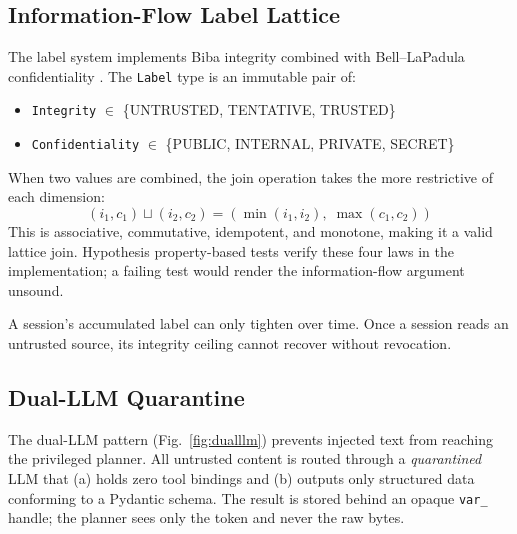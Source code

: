 \documentclass[10pt,conference]{IEEEtran}
\begin{document}
\subsection{Information-Flow Label Lattice}

The label system implements Biba integrity \cite{biba1977integrity} combined
with Bell--LaPadula confidentiality \cite{bell1973secure}. The \texttt{Label}
type is an immutable pair of:
\begin{itemize}
  \item \texttt{Integrity} $\in$ \{UNTRUSTED, TENTATIVE, TRUSTED\}
  \item \texttt{Confidentiality} $\in$ \{PUBLIC, INTERNAL, PRIVATE, SECRET\}
\end{itemize}

When two values are combined, the join operation takes the more restrictive
of each dimension:
\begin{equation}
(i_1, c_1) \sqcup (i_2, c_2) = (\min(i_1, i_2), \;\max(c_1, c_2))
\end{equation}
This is associative, commutative, idempotent, and monotone, making it a valid
lattice join. Hypothesis property-based tests verify these four laws in the implementation;
a failing test would render the information-flow argument unsound.

A session's accumulated label can only tighten over time. Once a session
reads an untrusted source, its integrity ceiling cannot recover without
revocation.

\subsection{Dual-LLM Quarantine}

The dual-LLM pattern (Fig.~\ref{fig:dualllm}) prevents injected text from
reaching the privileged planner. All untrusted content is routed through a
\emph{quarantined} LLM that (a) holds zero tool bindings and (b) outputs
only structured data conforming to a Pydantic schema. The result is stored
behind an opaque \texttt{var\_} handle; the planner sees only the token
and never the raw bytes.
\end{document}
